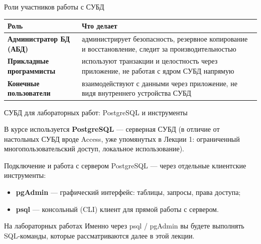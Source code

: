\documentclass[aspectratio=169]{beamer}
\begin{document}
\begin{frame}{Роли участников работы с СУБД}

\small
\begin{table}
\centering
\begin{tabular}{>{\bfseries}p{}|p{}}
\toprule
Роль & Что делает\\
\midrule
Администратор БД (АБД) &
администрирует безопасность, резервное копирование
и восстановление, следит за производительностью\\
Прикладные программисты &
используют транзакции и целостность через приложение,
не работая с ядром СУБД напрямую\\
Конечные пользователи &
взаимодействуют с данными через приложение,
не видя внутреннего устройства СУБД\\
\bottomrule
\end{tabular}
\end{table}

\end{frame}



\begin{frame}{СУБД для лабораторных работ: PostgreSQL и инструменты}

В курсе используется \textbf{PostgreSQL} — серверная СУБД
(в отличие от настольных СУБД вроде Access, уже
упомянутых в Лекции 1: ограниченный многопользовательский
доступ, локальное использование).

\vspace{0.4cm}

Подключение и работа с сервером PostgreSQL — через
отдельные клиентские инструменты:

\begin{itemize}
  \item \textbf{pgAdmin} — графический интерфейс: таблицы,
        запросы, права доступа;
  \item \textbf{psql} — консольный (CLI) клиент для прямой
        работы с сервером.
\end{itemize}

\vspace{0.4cm}

\begin{alertblock}{На лабораторных работах}
Именно через psql / pgAdmin вы будете выполнять
SQL-команды, которые рассматриваются далее в этой лекции.
\end{alertblock}

\end{frame}
\end{document}
